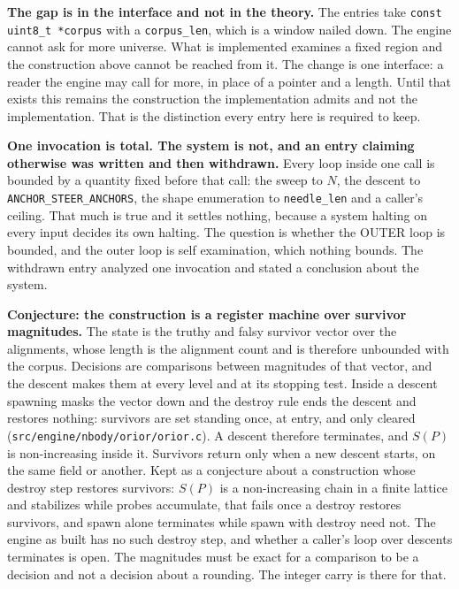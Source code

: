 \textbf{The gap is in the interface and not in the theory.} The entries take \texttt{const uint8\_t *corpus} with a \texttt{corpus\_len}, which is a window nailed down. The engine cannot ask for more universe. What is implemented examines a fixed region and the construction above cannot be reached from it. The change is one interface: a reader the engine may call for more, in place of a pointer and a length. Until that exists this remains the construction the implementation admits and not the implementation. That is the distinction every entry here is required to keep.

\textbf{One invocation is total. The system is not, and an entry claiming otherwise was written and then withdrawn.} Every loop inside one call is bounded by a quantity fixed before that call: the sweep to \(N\), the descent to \texttt{ANCHOR\_STEER\_ANCHORS}, the shape enumeration to \texttt{needle\_len} and a caller's ceiling. That much is true and it settles nothing, because a system halting on every input decides its own halting. The question is whether the OUTER loop is bounded, and the outer loop is self examination, which nothing bounds. The withdrawn entry analyzed one invocation and stated a conclusion about the system.

\textbf{Conjecture: the construction is a register machine over survivor magnitudes.} The state is the truthy and falsy survivor vector over the alignments, whose length is the alignment count and is therefore unbounded with the corpus. Decisions are comparisons between magnitudes of that vector, and the descent makes them at every level and at its stopping test. Inside a descent spawning masks the vector down and the destroy rule ends the descent and restores nothing: survivors are set standing once, at entry, and only cleared (\texttt{src/\allowbreak{}engine/\allowbreak{}nbody/\allowbreak{}orior/\allowbreak{}orior.c}). A descent therefore terminates, and \(S(P)\) is non-increasing inside it. Survivors return only when a new descent starts, on the same field or another. Kept as a conjecture about a construction whose destroy step restores survivors: \(S(P)\) is a non-increasing chain in a finite lattice and stabilizes while probes accumulate, that fails once a destroy restores survivors, and spawn alone terminates while spawn with destroy need not. The engine as built has no such destroy step, and whether a caller's loop over descents terminates is open. The magnitudes must be exact for a comparison to be a decision and not a decision about a rounding. The integer carry is there for that.

